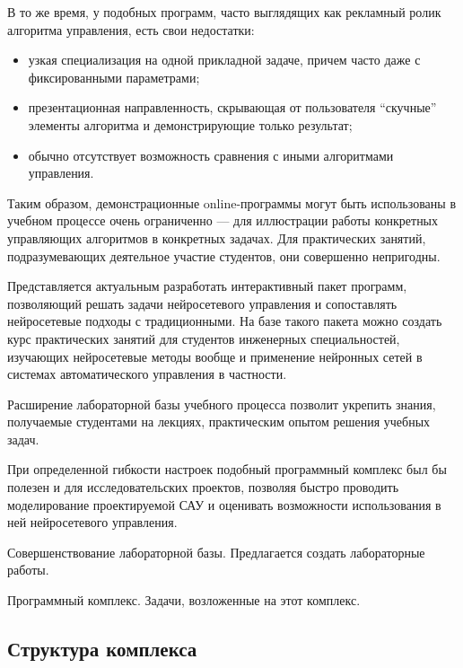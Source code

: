 В то же время, у подобных программ, часто выглядящих как рекламный
ролик алгоритма управления, есть свои недостатки:
\begin{itemize}

\item узкая специализация на одной прикладной задаче, причем часто
  даже с фиксированными параметрами;

\item презентационная направленность, скрывающая от пользователя
  ``скучные'' элементы алгоритма и демонстрирующие только результат;

\item обычно отсутствует возможность сравнения с иными алгоритмами
  управления.

\end{itemize}

Таким образом, демонстрационные online-программы могут быть
использованы в учебном процессе очень ограниченно --- для иллюстрации
работы конкретных управляющих алгоритмов в конкретных задачах.  Для
практических занятий, подразумевающих деятельное участие студентов,
они совершенно непригодны.

Представляется актуальным разработать интерактивный пакет программ,
позволяющий решать задачи нейросетевого управления и сопоставлять
нейросетевые подходы с традиционными.  На базе такого пакета можно
создать курс практических занятий для студентов инженерных
специальностей, изучающих нейросетевые методы вообще и применение
нейронных сетей в системах автоматического управления в частности.

Расширение лабораторной базы учебного процесса позволит укрепить
знания, получаемые студентами на лекциях, практическим опытом решения
учебных задач.  

При определенной гибкости настроек подобный программный комплекс был
бы полезен и для исследовательских проектов, позволяя быстро проводить
моделирование проектируемой САУ и оценивать возможности использования
в ней нейросетевого управления.





Совершенствование лабораторной базы.  Предлагается создать лабораторные работы.

Программный комплекс.
Задачи, возложенные на этот комплекс.

\subsection{Структура комплекса}

